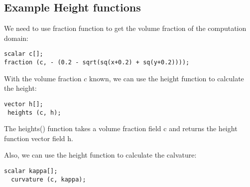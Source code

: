 \documentclass[12pt]{article} %
\begin{document}
\subsection{Example Height functions}
We need to use fraction function to get the volume fraction of the computation domain:
\begin{lstlisting}[style=CStyle]
scalar c[];
fraction (c, - (0.2 - sqrt(sq(x+0.2) + sq(y+0.2))));
\end{lstlisting}\par
With the volume fraction $c$ known, we can use the height function to calculate the height:
\begin{lstlisting}[style=CStyle]
 vector h[];
 heights (c, h);
\end{lstlisting}The heights() function takes a volume fraction field c and returns the height function vector field h.
\par
Also, we can use the height function to calculate the calvature:
\begin{lstlisting}[style=CStyle]
  scalar kappa[];
  curvature (c, kappa);
\end{lstlisting}
\end{document}
